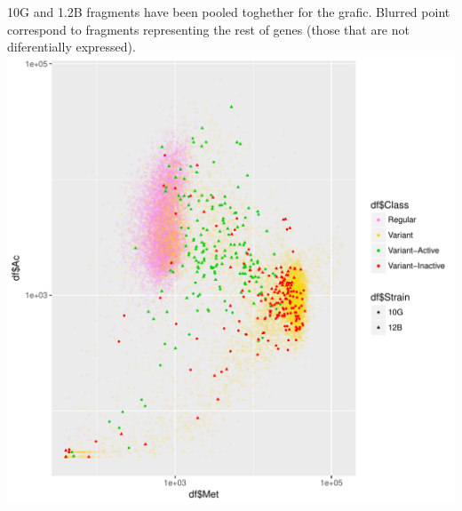 \documentclass{article}\usepackage[]{graphicx}\usepackage[]{color}
\newenvironment{knitrout}{}{} %
\begin{document}
10G and 1.2B fragments have been pooled toghether for the grafic. Blurred point correspond to fragments representing the rest of genes (those that are not diferentially expressed). 
\begin{knitrout}
\color{fgcolor}
\includegraphics[width=1\linewidth]{figure/ac_met_log_status_10G_12B-1} 

\end{knitrout}
\end{document}
